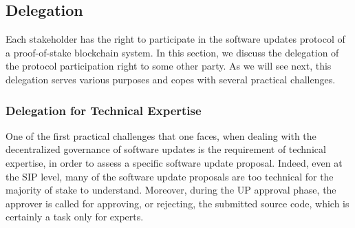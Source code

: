 
\subsection{Delegation} \label{appxdelegation}
Each stakeholder has the right to participate in the software updates protocol of a proof-of-stake blockchain system.
In this section, we discuss the delegation of the protocol participation right to some other party. As we will see next, this delegation serves various purposes and copes with several practical challenges.
\subsubsection{Delegation for Technical Expertise}\label{delfortech}
One of the first practical challenges that one faces, when dealing with the decentralized governance of software updates is the requirement of technical expertise, in order to assess a specific software update proposal. Indeed, even at the SIP level, many of the software update proposals are too technical for the majority of stake to understand. Moreover, during the UP approval phase, the approver is called for approving, or rejecting, the submitted source code, which is certainly a task only for experts.

